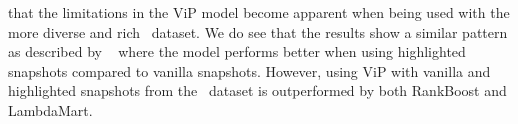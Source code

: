 that the limitations in the ViP model become apparent when being used with the more diverse and rich \datasetname~dataset. We do see that the results show a similar pattern as described by ~\citet{fan2017learning} where the model performs better when using highlighted snapshots compared to vanilla snapshots. However, using ViP with vanilla and highlighted snapshots from the \datasetname~dataset is outperformed by both RankBoost and LambdaMart. 
\fi




